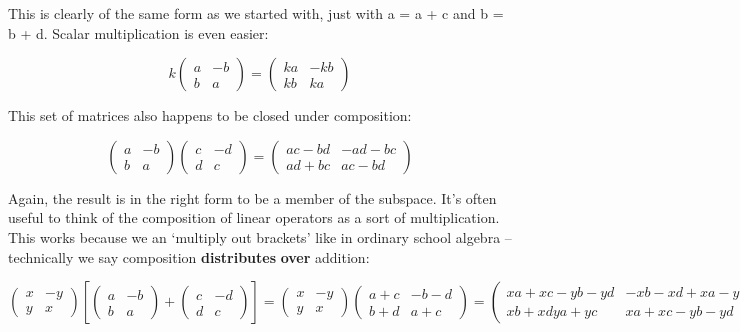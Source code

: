 \documentclass[oneside,english]{amsbook}
\numberwithin{section}{chapter}
\theoremstyle{plain}
\theoremstyle{definition}
\begin{document}
This is clearly of the same form as we started with, just with a = a + c
and b = b + d. Scalar multiplication is even easier:

\[k\begin{pmatrix}
	a & - b \\
	b & a
\end{pmatrix} = \begin{pmatrix}
	ka & - kb \\
	kb & ka
\end{pmatrix}\]

This set of matrices also happens to be closed under composition:

\[\begin{pmatrix}
	a & - b \\
	b & a
\end{pmatrix}\begin{pmatrix}
	c & - d \\
	d & c
\end{pmatrix} = \begin{pmatrix}
	ac - bd & - ad - bc \\
	ad + bc & ac - bd
\end{pmatrix}\]

Again, the result is in the right form to be a member of the subspace.
It's often useful to think of the composition of linear operators as a
sort of multiplication. This works because we an `multiply out
brackets' like in ordinary school algebra -- technically we say
composition \textbf{distributes} \textbf{over} addition:

\[{\begin{pmatrix}
		x & - y \\
		y & x
	\end{pmatrix}\left\lbrack \begin{pmatrix}
		a & - b \\
		b & a
	\end{pmatrix} + \begin{pmatrix}
		c & - d \\
		d & c
	\end{pmatrix} \right\rbrack = \begin{pmatrix}
		x & - y \\
		y & x
	\end{pmatrix}\begin{pmatrix}
		a + c & - b - d \\
		b + d & a + c
	\end{pmatrix}
}{= \begin{pmatrix}
		xa + xc - yb - yd & - xb - xd + xa - yc \\
		xb + xdya + yc & xa + xc - yb - yd
\end{pmatrix}}\]
\end{document}
